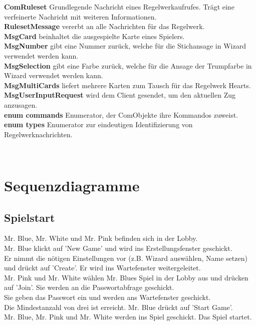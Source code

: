 \documentclass{article}
\begin{document}
		\textbf{ComRuleset} Grundlegende Nachricht eines Regelwerkaufrufes. Trägt eine verfeinerte Nachricht mit weiteren Informationen.\\
		\textbf{RulesetMessage} vererbt an alle Nachrichten für das Regelwerk.\\
		\textbf{MsgCard} beinhaltet die ausgespielte Karte eines Spielers.\\
		\textbf{MsgNumber} gibt eine Nummer zurück, welche für die Stichansage in Wizard verwendet werden kann.\\
		\textbf{MsgSelection} gibt eine Farbe zurück, welche für die Ansage der Trumpfarbe in Wizard verwendet werden kann.\\
		\textbf{MsgMultiCards} liefert mehrere Karten zum Tausch für das Regelwerk Hearts. \\
		\textbf{MsgUserInputRequest} wird dem Client gesendet, um den aktuellen Zug anzusagen.\\
		\textbf{enum commands}  Enumerator, der ComObjekte ihre Kommandos zuweist. \\
		\textbf{enum types} Enumerator zur eindeutigen Identifizierung von Regelwerknachrichten.

\ \\

\section{Sequenzdiagramme}
	\subsection{Spielstart}
		Mr. Blue, Mr. White und Mr. Pink befinden sich in der Lobby. \\
		Mr. Blue klickt auf 'New Game' und wird ins Erstellungsfenster geschickt. \\
		Er nimmt die nötigen Einstellungen vor (z.B. Wizard auswählen, Name setzen) und drückt auf 'Create'. Er wird ins Wartefenster weitergeleitet.\\
		Mr. Pink und Mr. White wählen Mr. Blues Spiel in der Lobby aus und drücken auf 'Join'. Sie werden an die Passwortabfrage geschickt.\\
		Sie geben das Passwort ein und werden ans Wartefenster geschickt.\\
		Die Mindestanzahl von drei ist erreicht. Mr. Blue drückt auf 'Start Game'.\\
		Mr. Blue, Mr. Pink und Mr. White werden ins Spiel geschickt. Das Spiel startet.\\
\end{document}
